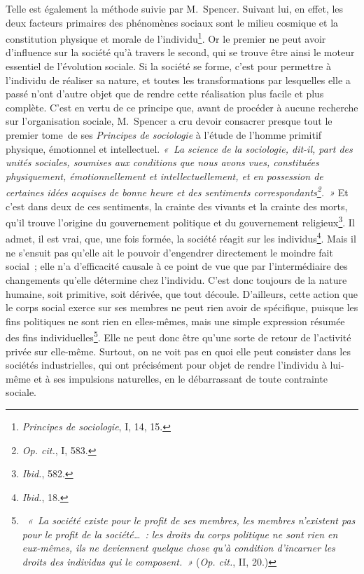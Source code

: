 \documentclass[french,twoside]{book} %
\begin{document}
Telle est également la méthode suivie par M. Spencer. Suivant lui, en effet, les deux facteurs primaires des phénomènes sociaux sont le milieu cosmique et la constitution physique et morale de l’individu\footnote{\emph{Principes de sociologie}, I, 14, 15.}. Or le premier ne peut avoir d’influence sur la société qu’à travers le second, qui se trouve être ainsi le moteur essentiel de l’évolution sociale. Si la société se forme, c’est pour permettre à l’individu de réaliser sa nature, et toutes les transformations par lesquelles elle a passé n’ont d’autre objet que de rendre cette réalisation plus facile et plus complète. C’est en vertu de ce principe que, avant de procéder à aucune recherche sur l’organisation sociale, M. Spencer a cru devoir consacrer presque tout le premier tome de ses \emph{Principes de sociologie} à l’étude de l’homme primitif physique, émotionnel et intellectuel. \emph{« La science de la sociologie, dit-il, part des unités sociales, soumises aux conditions que nous avons vues, constituées physiquement, émotionnellement et intellectuellement, et en possession de certaines idées acquises de bonne heure et des sentiments correspondants\footnote{{\itshape Op. cit.}, I, 583.}. »} Et c’est dans deux de ces sentiments, la crainte des vivants et la crainte des morts, qu’il trouve l’origine du gouvernement politique et du gouvernement religieux\footnote{{\itshape Ibid.}, 582.}. Il admet, il est vrai, que, une fois formée, la société réagit sur les individus\footnote{{\itshape Ibid.}, 18.}. Mais il ne s’ensuit pas qu’elle ait le pouvoir d’engendrer directement le moindre fait social ; elle n’a d’efficacité causale à ce point de vue que par l’intermédiaire des changements qu’elle détermine chez l’individu. C’est donc toujours de la nature humaine, soit primitive, soit dérivée, que tout découle. D’ailleurs, cette action que le corps social exerce sur ses membres ne peut rien avoir de spécifique, puisque les fins politiques ne sont rien en elles-mêmes, mais une simple expression résumée des fins individuelles\footnote{\emph{ « La société existe pour le profit de ses membres, les membres n’existent pas pour le profit de la société… : les droits du corps politique ne sont rien en eux-mêmes, ils ne deviennent quelque chose qu’à condition d’incarner les droits des individus qui le composent. »} ({\itshape Op. cit.}, II, 20.)}. Elle ne peut donc être qu’une sorte de retour de l’activité privée sur elle-même. Surtout, on ne voit pas en quoi elle peut consister dans les sociétés industrielles, qui ont précisément pour objet de rendre l’individu à lui-même et à ses impulsions naturelles, en le débarrassant de toute contrainte sociale.\par
\end{document}
